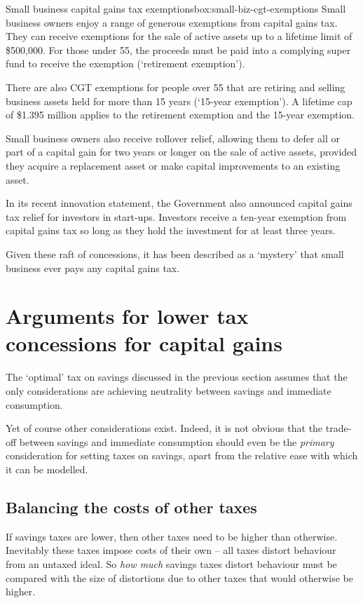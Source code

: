 \begin{smallbox}{Small business capital gains tax exemptions}{box:small-biz-cgt-exemptions}
Small business owners enjoy a range of generous exemptions from capital gains tax.  
They can receive exemptions for the sale of active assets up to a lifetime limit of \$500,000. For those under 55, the proceeds must be paid into a complying super fund to receive the exemption (‘retirement exemption’). 

There are also CGT exemptions for people over 55 that are retiring and selling business assets held for more than 15 years (‘15-year exemption’). A lifetime cap of \$1.395 million applies to the retirement exemption and the 15-year exemption. 

Small business owners also receive rollover relief, allowing them to defer all or part of a capital gain for two years or longer on the sale of active assets, provided they acquire a replacement asset or make capital improvements to an existing asset.

In its recent innovation statement, the Government also announced capital gains tax relief for investors in start-ups. Investors receive a ten-year exemption from capital gains tax so long as they hold the investment for at least three years.

Given these raft of concessions, it has been described as a ‘mystery’ that small business ever pays any capital gains tax.

\end{smallbox}


\section{Arguments for lower tax concessions for capital gains}\label{subsec:arguments-lower-tax-concessions-for-capital-gains}

The ‘optimal’ tax on savings discussed in the previous section assumes that the only considerations are achieving neutrality between savings and immediate consumption.

Yet of course other considerations exist. Indeed, it is not obvious that the trade-off between savings and immediate consumption should even be the \emph{primary} consideration for setting taxes on savings, apart from the relative ease with which it can be modelled.
\subsection{Balancing the costs of other taxes}
If savings taxes are lower, then other taxes need to be higher than otherwise. Inevitably these taxes impose costs of their own – all taxes distort behaviour from an untaxed ideal. So \emph{how much} savings taxes distort behaviour must be compared with the size of distortions due to other taxes that would otherwise be higher.

